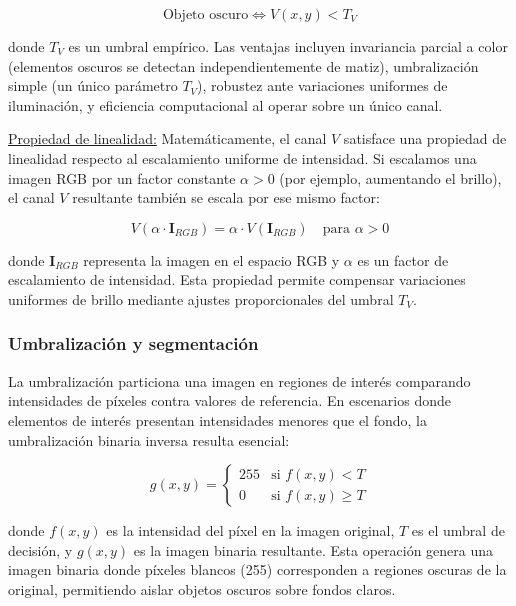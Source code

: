 \begin{equation}
\text{Objeto oscuro} \Leftrightarrow V(x,y) < T_V
\end{equation}

donde $T_V$ es un umbral empírico. 
Las ventajas incluyen invariancia parcial a color (elementos oscuros se detectan independientemente de matiz), umbralización simple (un único parámetro $T_V$), robustez ante variaciones uniformes de iluminación, y eficiencia computacional al operar sobre un único canal.

\underline{Propiedad de linealidad:} Matemáticamente, el canal $V$ satisface una propiedad de linealidad respecto al escalamiento uniforme de intensidad. Si escalamos una imagen RGB por un factor constante $\alpha > 0$ (por ejemplo, aumentando el brillo), el canal $V$ resultante también se escala por ese mismo factor:

\begin{equation}
V(\alpha \cdot \mathbf{I}_{RGB}) = \alpha \cdot V(\mathbf{I}_{RGB}) \quad \text{para } \alpha > 0
\end{equation}

donde $\mathbf{I}_{RGB}$ representa la imagen en el espacio RGB y $\alpha$ es un factor de escalamiento de intensidad. Esta propiedad permite compensar variaciones uniformes de brillo mediante ajustes proporcionales del umbral $T_V$.

\subsubsection{Umbralización y segmentación}

La umbralización particiona una imagen en regiones de interés comparando intensidades de píxeles contra valores de referencia. En escenarios donde elementos de interés presentan intensidades menores que el fondo, la umbralización binaria inversa resulta esencial:

\begin{equation}
g(x,y) = \begin{cases}
255 & \text{si } f(x,y) < T \\
0 & \text{si } f(x,y) \geq T
\end{cases}
\end{equation}

donde $f(x,y)$ es la intensidad del píxel en la imagen original, $T$ es el umbral de decisión, y $g(x,y)$ es la imagen binaria resultante. Esta operación genera una imagen binaria donde píxeles blancos (255) corresponden a regiones oscuras de la original, permitiendo aislar objetos oscuros sobre fondos claros.

